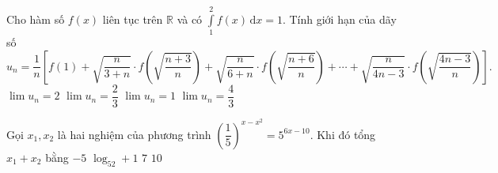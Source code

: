 \begin{ex}%
Cho hàm số $f(x)$ liên tục trên $\mathbb{R}$ và có $\displaystyle\int\limits_1^2 f(x)\mathrm{\, d}x=1$. Tính giới hạn của dãy số
$$
u_n=\dfrac{1}{n}\left[f(1)+\sqrt{\dfrac{n}{3+n}}\cdot f\left(\sqrt{\dfrac{n+3}{n}}\right)+\sqrt{\dfrac{n}{6+n}}\cdot f\left(\sqrt{\dfrac{n+6}{n}}\right)+\cdots +\sqrt{\dfrac{n}{4n-3}}\cdot f\left(\sqrt{\dfrac{4n-3}{n}}\right)\right].
$$
\choice
{$\displaystyle\lim u_n=2$}
{\True $\displaystyle\lim u_n=\dfrac{2}{3}$}
{$\displaystyle\lim u_n=1$}
{$\displaystyle\lim u_n=\dfrac{4}{3}$}
\end{ex}
\begin{ex}%
Gọi $x_1,x_2$ là hai nghiệm của phương trình $\left(\dfrac{1}{5}\right)^{x-x^2}=5^{6x-10}$. Khi đó tổng $x_1+x_2$ bằng
\choice
{$-5$}
{$\log_52+1$}
{\True $7$}
{$10$}
\end{ex}

